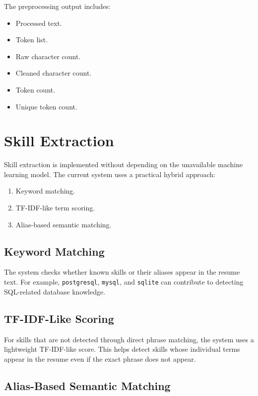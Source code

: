 \documentclass[12pt,a4paper]{article}
\begin{document}
The preprocessing output includes:

\begin{itemize}
    \item Processed text.
    \item Token list.
    \item Raw character count.
    \item Cleaned character count.
    \item Token count.
    \item Unique token count.
\end{itemize}

\section{Skill Extraction}

Skill extraction is implemented without depending on the unavailable machine learning model. The current system uses a practical hybrid approach:

\begin{enumerate}
    \item Keyword matching.
    \item TF-IDF-like term scoring.
    \item Alias-based semantic matching.
\end{enumerate}

\subsection{Keyword Matching}

The system checks whether known skills or their aliases appear in the resume text. For example, \texttt{postgresql}, \texttt{mysql}, and \texttt{sqlite} can contribute to detecting SQL-related database knowledge.

\subsection{TF-IDF-Like Scoring}

For skills that are not detected through direct phrase matching, the system uses a lightweight TF-IDF-like score. This helps detect skills whose individual terms appear in the resume even if the exact phrase does not appear.

\subsection{Alias-Based Semantic Matching}
\end{document}
